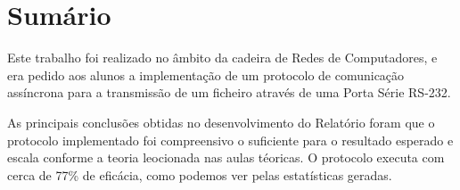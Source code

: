 \documentclass[a4paper, 11pt]{article}
\begin{document}
\maketitle
\thispagestyle{empty}


\newpage

%
%
%
%
%
%
%

\tableofcontents

\newpage

\section{Sumário}
\normalsize 

Este trabalho foi realizado no âmbito da cadeira de Redes de Computadores, e era pedido aos alunos a implementação de um protocolo de comunicação assíncrona para a transmissão de um ficheiro através de uma Porta Série RS-232.

As principais conclusões obtidas no desenvolvimento do Relatório foram que o protocolo implementado foi compreensivo o suficiente para o resultado esperado e escala conforme a teoria leocionada nas aulas téoricas. O protocolo executa com cerca de 77\% de eficácia, como podemos ver pelas estatísticas geradas.
\end{document}
